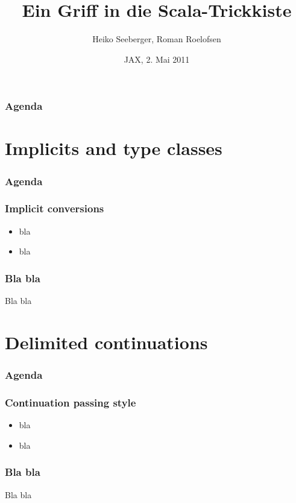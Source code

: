 \documentclass{beamer}
\title{Ein Griff in die Scala-Trickkiste}
\author{Heiko Seeberger, Roman Roelofsen}
\institute{WeigleWilczek}
\date{JAX, 2. Mai 2011}
\begin{document}
\begin{frame}
  \titlepage
\end{frame}


\begin{frame}
  \frametitle{Agenda}
  \tableofcontents
\end{frame}


\section{Implicits and type classes}

\begin{frame}
  \frametitle{Agenda}
  \tableofcontents[currentsection]
\end{frame}

\begin{frame}
  \frametitle{Implicit conversions}
  \begin{itemize}
    \item bla
    \item bla
  \end{itemize}
\end{frame}

\begin{frame}
  \frametitle{Bla bla}
  Bla bla
\end{frame}


\section{Delimited continuations}

\begin{frame}
  \frametitle{Agenda}
  \tableofcontents[currentsection]
\end{frame}

\begin{frame}
  \frametitle{Continuation passing style}
  \begin{itemize}
    \item bla
    \item bla
  \end{itemize}
\end{frame}

\begin{frame}
  \frametitle{Bla bla}
  Bla bla
\end{frame}
\end{document}
